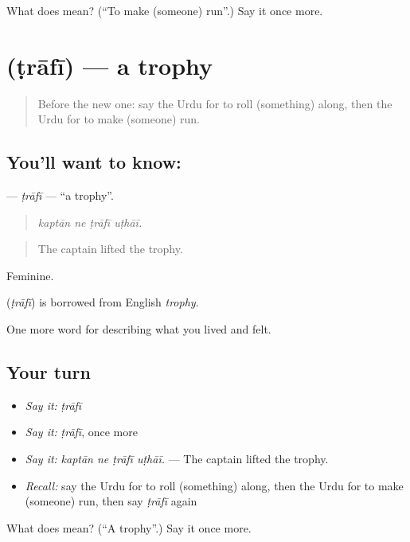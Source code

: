 \begin{tcolorbox}[breakable,colback=teal!4,colframe=teal!35!black,title={Before you move on}]
What does  mean? (\textquotedblleft{}To make (someone) run\textquotedblright{}.) Say it once more.
\end{tcolorbox}
\section[\texorpdfstring{\ur{ٹرافی} (ṭrāfī)}{ٹرافی (ṭrāfī)}]{ (ṭrāfī) — a trophy}

\label{lesson:UR-C522-trafi}



\begin{quote}
Before the new one: say the Urdu for to roll (something) along, then the Urdu for to make (someone) run.
\end{quote}

\subsection*{You'll want to know: }
\textbf{} — \emph{ṭrāfī} — \textquotedblleft{}a trophy\textquotedblright{}.

\begin{quote}
   
\end{quote}

\begin{quote}
\emph{kaptān ne ṭrāfī uṭhāī.}
\end{quote}

\begin{quote}
The captain lifted the trophy.
\end{quote}

Feminine.

\begin{cousinweb}
\textbf{} (\emph{ṭrāfī}) is borrowed from English \emph{trophy}.
\end{cousinweb}

\begin{grammarlens}[title={What you've built}]
One more word for describing what you lived and felt.
\end{grammarlens}

\subsection*{Your turn}
\begin{itemize}
\raggedright
  \item \emph{Say it:} \emph{ṭrāfī}
  \item \emph{Say it:} \emph{ṭrāfī}, once more
  \item \emph{Say it:} \emph{kaptān ne ṭrāfī uṭhāī.} — The captain lifted the trophy.
  \item \emph{Recall:} say the Urdu for to roll (something) along, then the Urdu for to make (someone) run, then say \emph{ṭrāfī} again
\end{itemize}

\begin{tcolorbox}[breakable,colback=teal!4,colframe=teal!35!black,title={Before you move on}]
What does  mean? (\textquotedblleft{}A trophy\textquotedblright{}.) Say it once more.
\end{tcolorbox}
